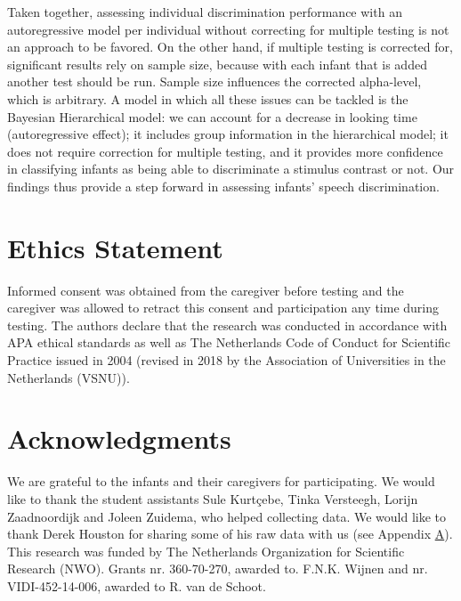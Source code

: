 \documentclass[openright,titlepage,12pt,a4paper]{book}
\begin{document}
Taken together, assessing individual discrimination performance with an autoregressive model per individual without correcting for multiple testing is not an approach to be favored. On the other hand, if multiple testing is corrected for, significant results rely on sample size, because with each infant that is added another test should be run. Sample size influences the corrected alpha-level, which is arbitrary. A model in which all these issues can be tackled is the Bayesian Hierarchical model: we can account for a decrease in looking time (autoregressive effect); it includes group information in the hierarchical model; it does not require correction for multiple testing, and it provides more confidence in classifying infants as being able to discriminate a stimulus contrast or not. Our findings thus provide a step forward in assessing infants' speech discrimination.

\hypertarget{ch04ethics}{%
\section*{Ethics Statement}\label{ch04ethics}}

Informed consent was obtained from the caregiver before testing and the caregiver was allowed to retract this consent and participation any time during testing. The authors declare that the research was conducted in accordance with APA ethical standards as well as The Netherlands Code of Conduct for Scientific Practice issued in 2004 (revised in 2018 by the Association of Universities in the Netherlands (VSNU)).

\hypertarget{ch04acknowledgments}{%
\section*{Acknowledgments}\label{ch04acknowledgments}}

We are grateful to the infants and their caregivers for participating. We would like to thank the student assistants Sule Kurtçebe, Tinka Versteegh, Lorijn Zaadnoordijk and Joleen Zuidema, who helped collecting data. We would like to thank Derek Houston for sharing some of his raw data with us (see Appendix \protect\hyperlink{ch05appendix}{A}). This research was funded by The Netherlands Organization for Scientific Research (NWO). Grants nr. 360-70-270, awarded to. F.N.K. Wijnen and nr. VIDI-452-14-006, awarded to R. van de Schoot.
\end{document}
